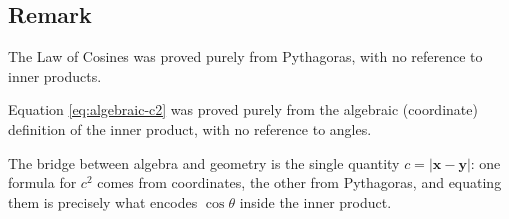 \documentclass[12pt]{article}
\newcommand{\MVec}[1]{\mathbf{#1}}
\newcommand{\vsp}{\vspace*{1em}}
\begin{document}
\subsection*{Remark}
The Law of Cosines was proved purely from Pythagoras, with no reference to
inner products.

\vsp

\noindent Equation \eqref{eq:algebraic-c2} was proved purely from the
algebraic (coordinate) definition of the inner product, with no reference
to angles.

\vsp

\noindent The bridge between algebra and geometry is the single quantity
$c = |\MVec{x}-\MVec{y}|$: one formula for $c^2$ comes from coordinates,
the other from Pythagoras, and equating them is precisely what encodes
$\cos\theta$ inside the inner product.
\end{document}
